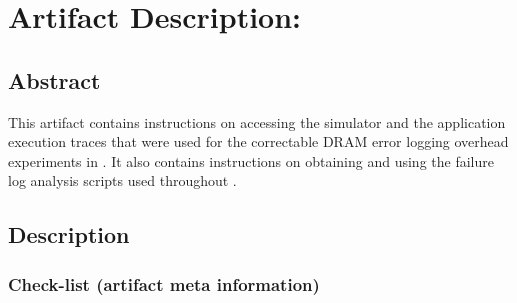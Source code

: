 \clearpage
\appendices
\section{Artifact Description: \myTitle}
\label{sec:appendix}


\subsection{Abstract}

This artifact contains instructions on accessing the \LogGOPSim simulator and
the application execution traces that were used for the correctable DRAM error 
logging overhead experiments in . 
It also contains instructions on obtaining and using the failure log analysis
scripts used throughout .

\subsection{Description}

\subsubsection{Check-list (artifact meta information)}


